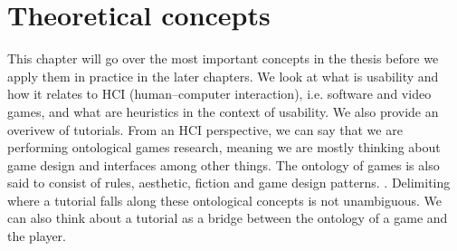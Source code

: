 \chapter{Theoretical concepts}

This chapter will go over the most important concepts in the thesis before we apply them in practice in the later chapters. We look at what is usability and how it relates to HCI (human--computer interaction), i.e. software and video games, and what are heuristics in the context of usability. We also provide an overivew of tutorials. From an HCI perspective, we can say that we are performing ontological games research, meaning we are mostly thinking about game design and interfaces among other things. The ontology of games is also said to consist of rules, aesthetic, fiction and game design patterns. \cite{Carter2014}. Delimiting where a tutorial falls along these ontological concepts is not unambiguous. We can also think about a tutorial as a bridge between the ontology of a game and the player.

